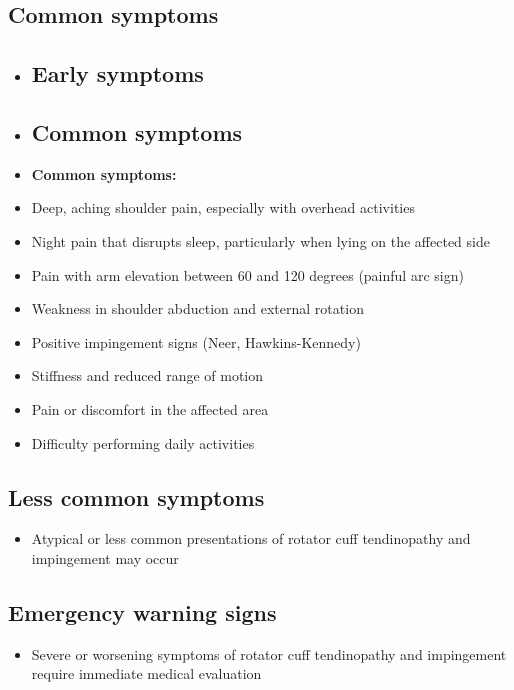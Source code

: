 \subsection{Common symptoms}
\begin{itemize}[noitemsep]
  \item \subsection{Early symptoms}
  \item \subsection{Common symptoms}
  \item \textbf{Common symptoms:}
  \item Deep, aching shoulder pain, especially with overhead activities
  \item Night pain that disrupts sleep, particularly when lying on the affected side
  \item Pain with arm elevation between 60 and 120 degrees (painful arc sign)
  \item Weakness in shoulder abduction and external rotation
  \item Positive impingement signs (Neer, Hawkins-Kennedy)
  \item Stiffness and reduced range of motion
  \item Pain or discomfort in the affected area
  \item Difficulty performing daily activities
\end{itemize}

\subsection{Less common symptoms}
\begin{itemize}[noitemsep]
  \item Atypical or less common presentations of rotator cuff tendinopathy and impingement may occur
\end{itemize}

\subsection{Emergency warning signs}
\begin{itemize}[noitemsep]
  \item Severe or worsening symptoms of rotator cuff tendinopathy and impingement require immediate medical evaluation
\end{itemize}
